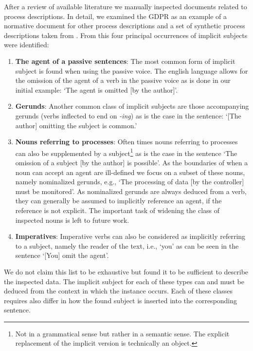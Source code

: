 \documentclass[times, 10pt,twocolumn]{article}
\begin{document}
After a review of available literature we manually inspected documents related
to process descriptions. In detail, we examined the GDPR \cite{gdpr} as an example
of a normative document for other process descriptions and a set of synthetic process
descriptions taken from \cite{NLP_bpm_data}. From this four principal occurrences of
implicit subjects were identified:

\begin{enumerate}
   \item \textbf{The agent of a passive sentences}: The most common form of implicit
   subject is found when using the passive voice. The english language allows for the
   omission of the agent of a verb in the passive voice as is done in our initial example:
   `The agent is omitted [by the author]'.
   \item \textbf{Gerunds}: Another common class of implicit subjects are those accompanying
   gerunds (verbs inflected to end on \textit{-ing}) as is the case in the sentence:
   `[The author] omitting the subject is common.' 
   \item \textbf{Nouns referring to processes}: Often times nouns referring to processes can also
   be supplemented by a subject\footnote{Not in a grammatical sense but rather in a semantic sense.
   The explicit replacement of the implicit version is technically an object.} as is the case in the
   sentence `The omission of a subject [by the author] is possible'. As the boundaries of when a noun
   can accept an agent are ill-defined we focus on a subset of these nouns, namely nominalized
   gerunds, e.g., `The processing of data [by the controller] must be monitored'. As nominalized gerunds
   are always deduced from a verb, they can generally be assumed to implicitly reference an agent, if 
   the reference is not explicit. The important task of widening the class of inspected nouns is
   left to future work.
   \item \textbf{Imperatives}: Imperative verbs can also be considered as implicitly referring to
   a subject, namely the reader of the text, i.e., `you' as can be seen in the sentence
   `[You] omit the agent'.
\end{enumerate}

We do not claim this list to be exhaustive but found it to be sufficient to describe the inspected data.
The implicit subject for each of these types can and must be deduced from the context in which the
instance occurs.
Each of these classes requires also differ in how the found subject is inserted into the corresponding
sentence.
\end{document}
